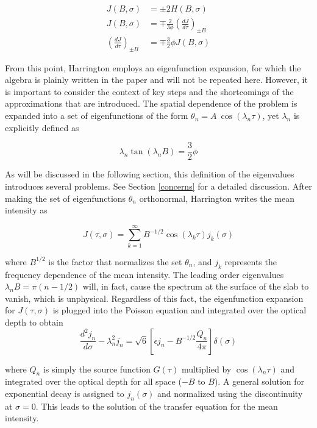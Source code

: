 \documentclass[onecolumn]{aastex63}
\begin{document}
\begin{equation}\label{harringtonbc}
    \begin{split} 
        J(B, \sigma) &= \pm 2 H(B, \sigma) \\
        J(B, \sigma) &= \mp \frac{2}{3\phi}\left(\frac{dJ}{d\tau}\right)_{\pm B} \\
        \left(\frac{dJ}{d\tau}\right)_{\pm B} &= \mp \frac{3}{2}\phi J(B, \sigma)
    \end{split}
\end{equation}

\noindent From this point, Harrington employs an eigenfunction expansion, for which the algebra is plainly written in the paper and will not be repeated here. However, it is important to consider the context of key steps and the shortcomings of the approximations that are introduced. The spatial dependence of the problem is expanded into a set of eigenfunctions of the form $\theta_n = A\ \cos(\lambda_n \tau)$, yet $\lambda_n$ is explicitly defined as

\begin{equation}
    \lambda_n \tan(\lambda_n B) = \frac{3}{2}\phi
\end{equation}

\noindent As will be discussed in the following section, this definition of the eigenvalues introduces several problems. See Section \ref{concerns} for a detailed discussion. After making the set of eigenfunctions $\theta_n$ orthonormal, Harrington writes the mean intensity as 

\begin{equation}
    J(\tau, \sigma) = \sum_{k=1}^{\infty} B^{-1/2} \cos(\lambda_k\tau)j_k(\sigma)
\end{equation}

\noindent where $B^{1/2}$ is the factor that normalizes the set $\theta_n$, and $j_k$ represents the frequency dependence of the mean intensity. The leading order eigenvalues $\lambda_nB = \pi(n-1/2)$ will, in fact, cause the spectrum at the surface of the slab to vanish, which is unphysical. Regardless of this fact, the eigenfunction expansion for $J(\tau, \sigma)$ is plugged into the Poisson equation and integrated over the optical depth to  obtain
\begin{equation}
    \frac{d^2j_n}{d\sigma} - \lambda_n^2 j_n = \sqrt{6}\left[\epsilon j_n - B^{-1/2} \frac{Q_n}{4\pi}\right]\delta(\sigma) 
\end{equation}

\noindent where $Q_n$ is simply the source function $G(\tau)$ multiplied by $\cos(\lambda_n \tau)$ and integrated over the optical depth for all space ($-B$ to $B$). A general solution for exponential decay is assigned to $j_n(\sigma)$ and normalized using the discontinuity at $\sigma=0$. This leads to the solution of the transfer equation for the mean intensity.
\end{document}
